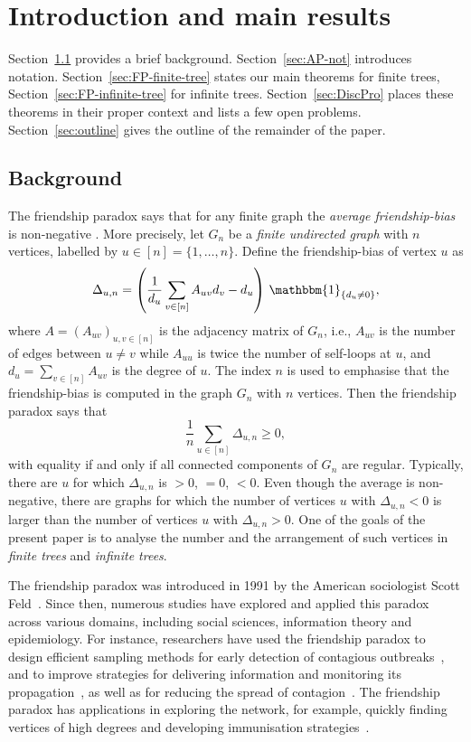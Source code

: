 \documentclass[11pt]{article}
\numberwithin{equation}{section}
\theoremstyle{plain}
\begin{document}
\newpage 

\small
\tableofcontents
\normalsize


\section{Introduction and main results}

Section~\ref{sec:B} provides a brief background. Section~\ref{sec:AP-not} introduces notation. Section~\ref{sec:FP-finite-tree} states our main theorems for finite trees, Section~\ref{sec:FP-infinite-tree} for infinite trees. Section~\ref{sec:DiscPro} places these theorems in their proper context and lists a few open problems. Section~\ref{sec:outline} gives the outline of the remainder of the paper.


\subsection{Background}
\label{sec:B}

The friendship paradox says that for any finite graph the \emph{average friendship-bias} is non-negative \cite{SF,HHP1}. More precisely, let $G_n$ be a \emph{finite undirected graph} with $n$ vertices, labelled by $u \in [n] = \{1,\ldots,n\}$. Define the friendship-bias of vertex $u$ as
\[
\Delta_{u,n} = \left(\frac{1}{d_u} \sum_{v \in [n]} A_{uv} d_v - d_u\right) \,\mathbbm{1}_{\{d_u \neq 0\}}, 
\]
where $A=(A_{uv})_{u,v\in [n]}$ is the adjacency matrix of $G_n$, i.e., $A_{uv}$ is the number of edges between $u \neq v$ while $A_{uu}$ is twice the number of self-loops at $u$, and $d_u = \sum_{v \in [n]} A_{uv}$ is the degree of $u$. The index $n$ is used to emphasise that the friendship-bias is computed in the graph $G_n$ with $n$ vertices. Then the friendship paradox says that
\[
\frac{1}{n} \sum_{u \in [n]} \Delta_{u,n} \geq 0,
\] 
with equality if and only if all connected components of $G_n$ are regular. Typically, there are $u$ for which $\Delta_{u,n}$ is $>0$, $=0$, $<0$. Even though the average is non-negative, there are graphs for which the number of vertices $u$ with $\Delta_{u,n} < 0$ is larger than the number of vertices $u$ with $\Delta_{u,n} > 0$. One of the goals of the present paper is to analyse the number and the arrangement of such vertices in \emph{finite trees} and \emph{infinite trees}.

The friendship paradox was introduced in 1991 by the American sociologist Scott Feld~\cite{SF}. Since then, numerous studies have explored and applied this paradox across various domains, including social sciences, information theory and epidemiology. For instance, researchers have used the friendship paradox to design efficient sampling methods for early detection of contagious outbreaks~\cite{CF}, and to improve strategies for delivering information and monitoring its propagation~\cite{KN}, as well as for reducing the spread of contagion~\cite{rosenblatt}. The friendship paradox has applications in exploring the network, for example, quickly finding vertices of high degrees \cite{avrachenkov2014quick} and developing immunisation strategies~\cite{cohen2003immunization, britton2007vaccination}. 
\end{document}
